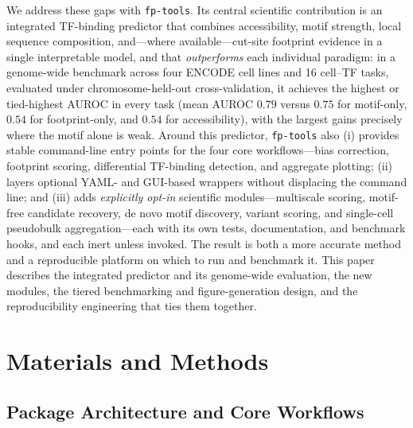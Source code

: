 \documentclass[biomedinformatics,article,submit,pdftex,moreauthors]{Definitions/mdpi}
\begin{document}
We address these gaps with \texttt{fp-tools}. Its central scientific contribution
is an integrated TF-binding predictor that combines accessibility, motif strength,
local sequence composition, and---where available---cut-site footprint evidence in
a single interpretable model, and that \emph{outperforms} each individual paradigm:
in a genome-wide benchmark across four ENCODE cell lines and 16 cell--TF tasks,
evaluated under chromosome-held-out cross-validation, it achieves the highest or
tied-highest AUROC in every task (mean AUROC $0.79$ versus $0.75$ for motif-only,
$0.54$ for footprint-only, and $0.54$ for accessibility), with the largest gains
precisely where the motif alone is weak. Around this predictor, \texttt{fp-tools}
also (i) provides stable command-line entry points for the four core
workflows---bias correction, footprint scoring, differential TF-binding detection,
and aggregate plotting; (ii) layers optional YAML- and GUI-based wrappers without
displacing the command line; and (iii) adds \emph{explicitly opt-in} scientific
modules---multiscale scoring, motif-free candidate recovery, de novo motif
discovery, variant scoring, and single-cell pseudobulk aggregation---each with its
own tests, documentation, and benchmark hooks, and each inert unless invoked. The
result is both a more accurate method and a reproducible platform on which to run
and benchmark it. This paper describes the integrated predictor and its genome-wide
evaluation, the new modules, the tiered benchmarking and figure-generation design,
and the reproducibility engineering that ties them together.

\section{Materials and Methods}

\subsection{Package Architecture and Core Workflows}
\end{document}
